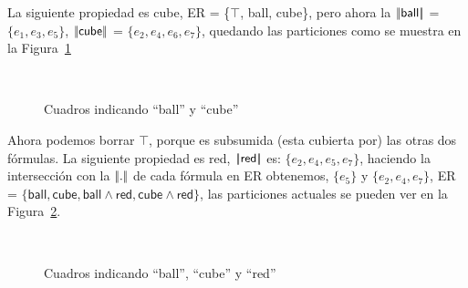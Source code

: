 La siguiente propiedad es \textsf{cube}, ER = \{$\top$, \textsf{ball}, \textsf{cube}\}, pero ahora la $|\!|\textsf{ball}|\!|$ = $\{e_1, e_3, e_5\}$, $|\!|\textsf{cube}|\!|$ = $\{e_2, e_4, e_6, e_7\}$, quedando las particiones como se muestra en la Figura~\ref{fig-modelo4}
\begin{figure}[ht]
\begin{center}
\\[0pt]
\caption{Cuadros indicando ``ball'' y ``cube''}
\label{fig-modelo4}
\end{center}
\end{figure}
Ahora podemos borrar $\top$, porque es subsumida (esta cubierta por) las otras dos f\'ormulas. La siguiente propiedad es  \textsf{red}, $|\!|\textsf{red}|\!|$ es: $\{e_2, e_4, e_5, e_7\}$, haciendo la intersecci\'on con la $|\!|.|\!|$ de cada f\'ormula en ER obtenemos, $\{e_5\}$ y $\{e_2, e_4, e_7\}$, ER = $\{\textsf{ball}, \textsf{cube}, \textsf{ball} \wedge \textsf{red}, \textsf{cube} \wedge \textsf{red}\}$, las particiones actuales se pueden ver en la Figura~\ref{fig-modelo9}.
\begin{figure}[ht]
\begin{center}
\\[0pt]
\caption{Cuadros indicando ``ball'', ``cube'' y ``red''}
\label{fig-modelo9}
\end{center}
\end{figure}

